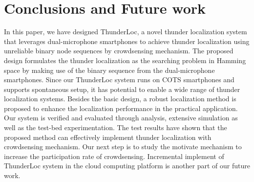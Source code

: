 
\section{Conclusions and Future work}

In this paper, we have designed ThunderLoc, a novel thunder localization system that leverages dual-microphone smartphones to achieve thunder localization using unreliable binary node sequences by crowdsensing mechanism.
The proposed design formulates the thunder localization as the searching problem in Hamming space by making use of the binary sequence from the dual-microphone smartphones.
Since our ThunderLoc system runs on COTS smartphones and supports spontaneous setup, it has potential to enable a wide range of thunder localization systems.
Besides the basic design, a robust localization method is proposed to enhance the localization performance in the practical application.
Our system is verified and evaluated through analysis, extensive simulation as well as the test-bed experimentation.
The test results have shown that the proposed method can effectively implement thunder localization with crowdsensing mechanism.
Our next step is to study the motivate mechanism to increase the participation rate of crowdsensing. 
Incremental implement of ThunderLoc system in the cloud computing platform is another part of our future work.




